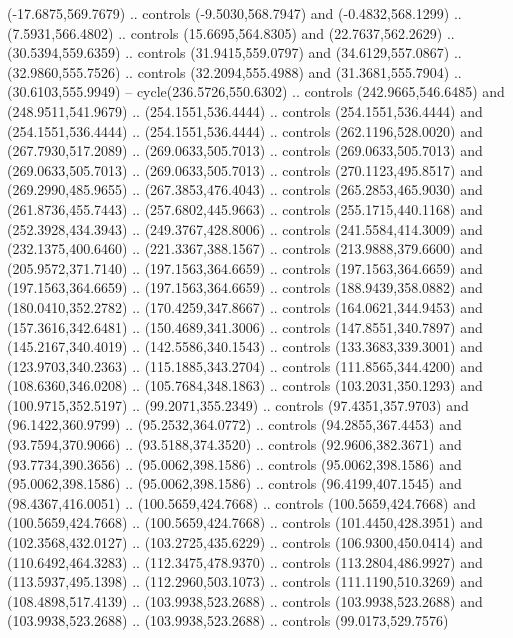 \begin{scope}[shift={(69.41462,-293.94043)}]
    (-17.6875,569.7679) .. controls (-9.5030,568.7947) and (-0.4832,568.1299) ..
    (7.5931,566.4802) .. controls (15.6695,564.8305) and (22.7637,562.2629) ..
    (30.5394,559.6359) .. controls (31.9415,559.0797) and (34.6129,557.0867) ..
    (32.9860,555.7526) .. controls (32.2094,555.4988) and (31.3681,555.7904) ..
    (30.6103,555.9949) -- cycle(236.5726,550.6302) .. controls (242.9665,546.6485)
    and (248.9511,541.9679) .. (254.1551,536.4444) .. controls (254.1551,536.4444)
    and (254.1551,536.4444) .. (254.1551,536.4444) .. controls (262.1196,528.0020)
    and (267.7930,517.2089) .. (269.0633,505.7013) .. controls (269.0633,505.7013)
    and (269.0633,505.7013) .. (269.0633,505.7013) .. controls (270.1123,495.8517)
    and (269.2990,485.9655) .. (267.3853,476.4043) .. controls (265.2853,465.9030)
    and (261.8736,455.7443) .. (257.6802,445.9663) .. controls (255.1715,440.1168)
    and (252.3928,434.3943) .. (249.3767,428.8006) .. controls (241.5584,414.3009)
    and (232.1375,400.6460) .. (221.3367,388.1567) .. controls (213.9888,379.6600)
    and (205.9572,371.7140) .. (197.1563,364.6659) .. controls (197.1563,364.6659)
    and (197.1563,364.6659) .. (197.1563,364.6659) .. controls (188.9439,358.0882)
    and (180.0410,352.2782) .. (170.4259,347.8667) .. controls (164.0621,344.9453)
    and (157.3616,342.6481) .. (150.4689,341.3006) .. controls (147.8551,340.7897)
    and (145.2167,340.4019) .. (142.5586,340.1543) .. controls (133.3683,339.3001)
    and (123.9703,340.2363) .. (115.1885,343.2704) .. controls (111.8565,344.4200)
    and (108.6360,346.0208) .. (105.7684,348.1863) .. controls (103.2031,350.1293)
    and (100.9715,352.5197) .. (99.2071,355.2349) .. controls (97.4351,357.9703)
    and (96.1422,360.9799) .. (95.2532,364.0772) .. controls (94.2855,367.4453)
    and (93.7594,370.9066) .. (93.5188,374.3520) .. controls (92.9606,382.3671)
    and (93.7734,390.3656) .. (95.0062,398.1586) .. controls (95.0062,398.1586)
    and (95.0062,398.1586) .. (95.0062,398.1586) .. controls (96.4199,407.1545)
    and (98.4367,416.0051) .. (100.5659,424.7668) .. controls (100.5659,424.7668)
    and (100.5659,424.7668) .. (100.5659,424.7668) .. controls (101.4450,428.3951)
    and (102.3568,432.0127) .. (103.2725,435.6229) .. controls (106.9300,450.0414)
    and (110.6492,464.3283) .. (112.3475,478.9370) .. controls (113.2804,486.9927)
    and (113.5937,495.1398) .. (112.2960,503.1073) .. controls (111.1190,510.3269)
    and (108.4898,517.4139) .. (103.9938,523.2688) .. controls (103.9938,523.2688)
    and (103.9938,523.2688) .. (103.9938,523.2688) .. controls (99.0173,529.7576)

\end{scope}
